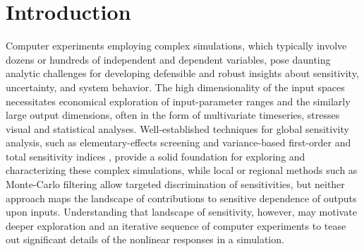 \documentclass[12pt]{article}
\begin{document}
\section{Introduction}
\label{sec:intro}

Computer experiments employing complex simulations, which typically involve dozens or hundreds of independent and dependent variables, pose daunting analytic challenges for developing defensible and robust insights about sensitivity, uncertainty, and system behavior. The high dimensionality of the input spaces necessitates economical exploration of input-parameter ranges and the similarly large output dimensions, often in the form of multivariate timeseries, stresses visual and statistical analyses. Well-established techniques for global sensitivity analysis, such as elementary-effects screening and variance-based first-order and total sensitivity indices \cite{saltelli_global_2008}, provide a solid foundation for exploring and characterizing these complex simulations, while local or regional methods such as Monte-Carlo filtering \cite{borgonovo_sensitivity_2016} allow targeted discrimination of sensitivities, but neither approach maps the landscape of contributions to sensitive dependence of outputs upon inputs. Understanding that landscape of sensitivity, however, may motivate deeper exploration and an iterative sequence of computer experiments to tease out significant details of the nonlinear responses in a simulation.
\end{document}
